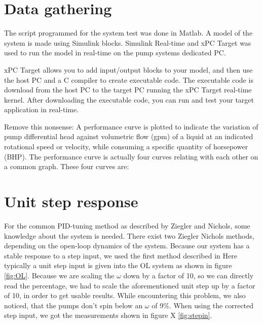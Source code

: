 

\section{Data gathering}\label{sec:data_gathering}
The script programmed for the system test was done in Matlab. 
A model of the system is made using Simulink blocks. 
Simulink Real-time and xPC Target was used to run the model in real-time on 
the pump systems dedicated PC. 




xPC Target allows you to add input/output blocks to your model, and then use the host 
PC and a C compiler to create executable code. The executable code is download 
from the host PC to the target PC running the xPC Target real-time kernel. 
After downloading the executable code, you can run and test your target 
application in real-time. 


Remove this nonsense:
A performance curve is plotted to indicate the variation of pump differential head against volumetric flow (gpm) of a liquid at an indicated rotational speed or velocity, while consuming a specific quantity of horsepower (BHP). The performance curve is actually four curves relating with each other on a common graph. These four curves are:

\section{Unit step response}
For the common PID-tuning method as described by Ziegler and Nichols,
some knowledge about the system is needed.
There exist two Ziegler Nichols methods,
depending on the open-loop dynamics of the system.
Because our system has a stable response to a step input, we used the first method described in 
Here typically a unit step input is given into the OL system as shown in figure \ref{fig:OL}.
\label{fig:OL}
Because we are scaling the $\omega$ down by a factor of 10, so we can directly read the percentage,
we had to scale the aforementioned unit step up by a factor of 10,
in order to get usable results.
While encountering this problem, we also noticed, that the pumps don't spin below an $\omega$ of 9\%.
When using the corrected step input, we got the measurements shown in figure X \ref{fig:stepin}.

